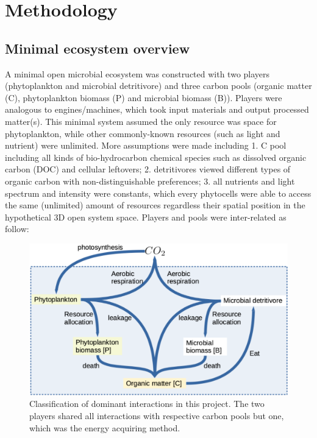 \documentclass[../thesis.tex]{subfiles} %
\begin{document}
\section{Methodology}
\subsection{Minimal ecosystem overview}
A minimal open microbial ecosystem was constructed with two players (phytoplankton and microbial detritivore) and three carbon pools (organic matter (C), phytoplankton biomass (P) and microbial biomass (B)).  Players were analogous to engines/machines, which took input materials and output processed matter(s).  This minimal system assumed the only resource was space for phytoplankton, while other commonly-known resources (such as light and nutrient) were unlimited.  More assumptions were made including 1. C pool including all kinds of bio-hydrocarbon chemical species such as dissolved organic carbon (DOC) and cellular leftovers; 2. detritivores viewed different types of organic carbon with non-distinguishable preferences; 3. all nutrients and light spectrum and intensity were constants, which every phytocells were able to access the same (unlimited) amount of resources regardless their spatial position in the hypothetical 3D open system space.  Players and pools were inter-related as follow:

\begin{figure}[H]
    \centering
    \includegraphics[width=.8\linewidth]{result/model.png}
    \caption[Model visualization]{Classification of dominant interactions in this project.  The two players shared all interactions with respective carbon pools but one, which was the energy acquiring method.}
    \label{modelInWord}
\end{figure}
\end{document}
